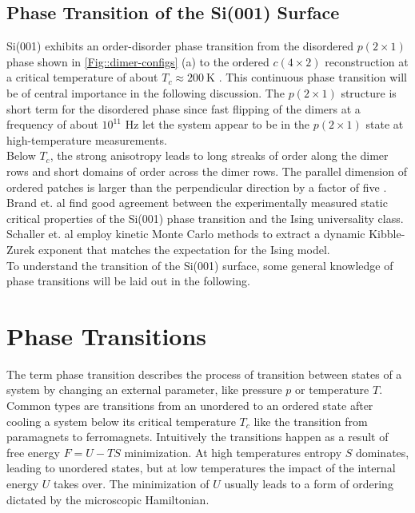 	\section{Phase Transition of the Si(001) Surface}
	Si(001) exhibits an order-disorder phase transition from the disordered $p(2\times1)$ phase shown in \autoref{Fig::dimer-configs} (a) to the ordered $c(4\times2)$ reconstruction at a critical temperature of about $T_c \approx 200~\text{K}$ \cite{tabata1987order, brand2023dimer}. This continuous phase transition will be of central importance in the following discussion. The $p(2\times1)$ structure is short term for the disordered phase since fast flipping of the dimers at a frequency of about $ 10^{11} \text{ Hz}$ \cite{dabrowski1992self} let the system appear to be in the $p(2\times1)$ state at high-temperature measurements. \\
	
	Below $T_c$, the strong anisotropy leads to long streaks of order along the dimer rows and short domains of order across the dimer rows. The parallel dimension of ordered patches is larger than the perpendicular direction by a factor of five \cite{brand2023dimer}. Brand et. al \cite{brand2023critical, brand2023dimer} find good agreement between the experimentally measured static critical properties of the Si(001) phase transition and the Ising universality class. Schaller et. al \cite{schaller2023sequential} employ kinetic Monte Carlo methods to extract a dynamic Kibble-Zurek exponent that matches the expectation for the Ising model. \\%
	
	To understand the transition of the Si(001) surface, some general knowledge of phase transitions will be laid out in the following.
	\chapter{Phase Transitions} \label{Chapter::Phase-Transitions}
	
	The term phase transition describes the process of transition between states of a system by changing an external parameter, like pressure $p$ or temperature $T$. Common types are transitions from an unordered to an ordered state after cooling a system below its critical temperature $T_c$ like the transition from paramagnets to ferromagnets. Intuitively the transitions happen as a result of free energy $F =	U - TS$ minimization. At high temperatures entropy $S$ dominates, leading to unordered states, but at low temperatures the impact of the internal energy $U$ takes over. The minimization of $U$ usually leads to a form of ordering dictated by the microscopic Hamiltonian. \\
	
